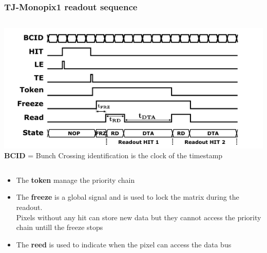     \begin{frame}[noframenumbering]
        \frametitle{TJ-Monopix1 readout sequence}
        \begin{columns}
            \centering
            \includegraphics[width=1.\linewidth]{figures/Monopix1/readout_timing.png}
        \textbf{BCID} = Bunch Crossing identification
        is the clock of the timestamp   \\
        \end{columns}
        \begin{itemize}
            \item The \textbf{token} manage the priority chain
            \item The \textbf{freeze} is a global signal and is used to lock the matrix during the readout. \\
            \small Pixels without any hit can store new data but they cannot access the priority chain untill the freeze stops
            \item The \textbf{reed} is used to indicate when the pixel can access the data bus
        \end{itemize}
    \end{frame} 


